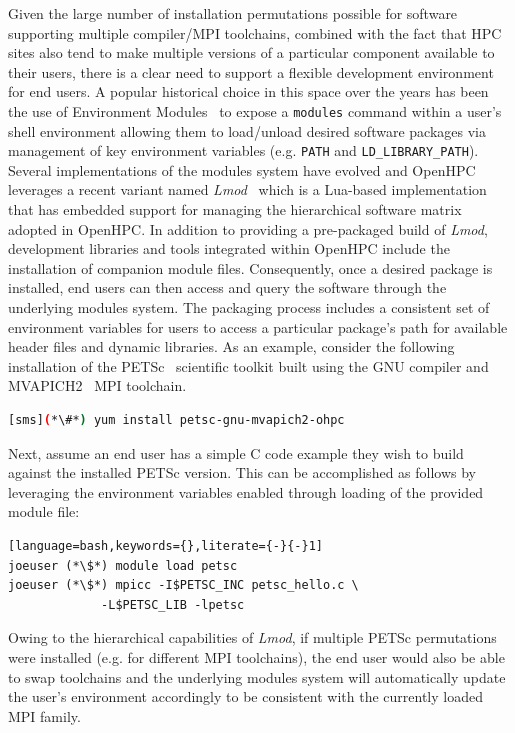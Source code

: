 \documentclass{sig-alternate-05-2015}
\begin{document}
\noindent
Given the large number of installation permutations possible for software
supporting multiple compiler/MPI toolchains, combined with the fact that HPC
sites also tend to make multiple versions of a particular component available
to their users, there is a clear need to support a flexible development environment for end
users. A popular historical choice in this space over the years has been the
use of Environment Modules~\cite{furlani_1996} to expose a \texttt{modules}
command within a user's shell environment allowing them to load/unload desired
software packages via management of key environment variables
(e.g. \texttt{{PATH}} and \texttt{{LD\_LIBRARY\_PATH}}). Several
implementations of the modules system have evolved and OpenHPC leverages a
recent variant named {\em Lmod}~\cite{tacc_sc_best_practices:2011,lmod_url}
which is a Lua-based implementation that has embedded support for managing the
hierarchical software matrix adopted in OpenHPC.  In addition to providing a
pre-packaged build of {\em Lmod}, development libraries and tools integrated
within OpenHPC include the installation of companion module files.
Consequently, once a desired package is installed, end users can then access
and query the software through the underlying modules system. The packaging
process includes a consistent set of environment variables for users to
access a particular package's path for available header files and dynamic
libraries. As an example, consider the following installation of the
PETSc~\cite{PETSc_url} scientific toolkit built using the GNU compiler and
MVAPICH2~\cite{mvapich2} MPI toolchain.

\begin{lstlisting}[language=bash,keywords={}]
[sms](*\#*) yum install petsc-gnu-mvapich2-ohpc
\end{lstlisting}

\noindent
Next, assume an end user has a simple C code example they wish to build against
the installed PETSc version. This can be accomplished as follows by leveraging
the environment variables enabled through loading of the provided module file:

\begin{lstlisting}[language=bash,keywords={},literate={-}{-}1]
joeuser (*\$*) module load petsc
joeuser (*\$*) mpicc -I$PETSC_INC petsc_hello.c \
             -L$PETSC_LIB -lpetsc
\end{lstlisting}

Owing to the hierarchical capabilities of {\em Lmod}, if multiple PETSc
permutations were installed (e.g. for different MPI toolchains), the end user
would also be able to swap toolchains and the underlying modules system will
automatically update the user's environment accordingly to be consistent with
the currently loaded MPI family.
\end{document}
